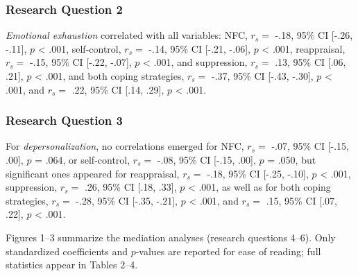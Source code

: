 \documentclass[
  man]{apa6}
\begin{document}
\subsubsection{Research Question 2}\label{research-question-2}

\emph{Emotional exhaustion} correlated with all variables: NFC, \(r_{s}=\) -.18, 95\% CI {[}-.26, -.11{]}, \(p\) \textless{} .001, self-control, \(r_{s}=\) -.14, 95\% CI {[}-.21, -.06{]}, \(p\) \textless{} .001, reappraisal, \(r_{s}=\) -.15, 95\% CI {[}-.22, -.07{]}, \(p\) \textless{} .001, and suppression, \(r_{s}=\) .13, 95\% CI {[}.06, .21{]}, \(p\) \textless{} .001, and both coping strategies, \(r_{s}=\) -.37, 95\% CI {[}-.43, -.30{]}, \(p\) \textless{} .001, and \(r_{s}=\) .22, 95\% CI {[}.14, .29{]}, \(p\) \textless{} .001.

\subsubsection{Research Question 3}\label{research-question-3}

For \emph{depersonalization}, no correlations emerged for NFC, \(r_{s}=\) -.07, 95\% CI {[}-.15, .00{]}, \(p\) = .064, or self-control, \(r_{s}=\) -.08, 95\% CI {[}-.15, .00{]}, \(p\) = .050, but significant ones appeared for reappraisal, \(r_{s}=\) -.18, 95\% CI {[}-.25, -.10{]}, \(p\) \textless{} .001, suppression, \(r_{s}=\) .26, 95\% CI {[}.18, .33{]}, \(p\) \textless{} .001, as well as for both coping strategies, \(r_{s}=\) -.28, 95\% CI {[}-.35, -.21{]}, \(p\) \textless{} .001, and \(r_{s}=\) .15, 95\% CI {[}.07, .22{]}, \(p\) \textless{} .001.

Figures 1--3 summarize the mediation analyses (research questions 4--6). Only standardized coefficients and \(p\)-values are reported for ease of reading; full statistics appear in Tables 2--4.
\end{document}
